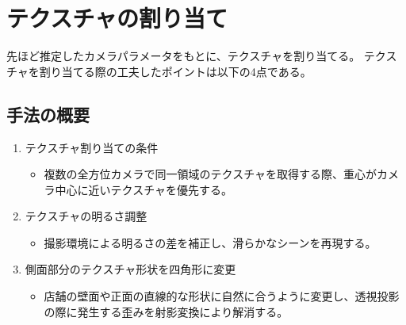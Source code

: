 \documentclass[]{jarticle}          %
\begin{document}
\section{テクスチャの割り当て}
先ほど推定したカメラパラメータをもとに、テクスチャを割り当てる。
テクスチャを割り当てる際の工夫したポイントは以下の4点である。
\subsection{手法の概要}
\begin{enumerate}
  \item テクスチャ割り当ての条件
  \begin{itemize}
    \item 複数の全方位カメラで同一領域のテクスチャを取得する際、重心がカメラ中心に近いテクスチャを優先する。
  \end{itemize}
  
  \item テクスチャの明るさ調整
  \begin{itemize}
    \item 撮影環境による明るさの差を補正し、滑らかなシーンを再現する。
  \end{itemize}
  
  \item 側面部分のテクスチャ形状を四角形に変更
  \begin{itemize}
    \item 店舗の壁面や正面の直線的な形状に自然に合うように変更し、透視投影の際に発生する歪みを射影変換により解消する。
  \end{itemize}
\end{enumerate}
\end{document}
